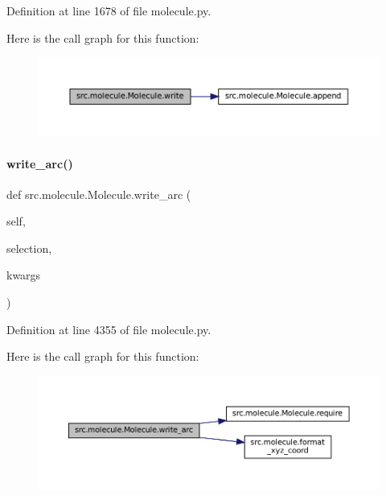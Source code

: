 Definition at line 1678 of file molecule.\+py.

Here is the call graph for this function\+:
\nopagebreak
\begin{figure}[H]
\begin{center}
\leavevmode
\includegraphics[width=350pt]{classsrc_1_1molecule_1_1Molecule_a557af72409188133ef446ee8dbed2338_cgraph}
\end{center}
\end{figure}
\mbox{\label{classsrc_1_1molecule_1_1Molecule_a5c04a001643a8165de635697f2d418f3}} 
\paragraph{\texorpdfstring{write\+\_\+arc()}{write\_arc()}}
{\footnotesize\ttfamily def src.\+molecule.\+Molecule.\+write\+\_\+arc (\begin{DoxyParamCaption}\item[{}]{self,  }\item[{}]{selection,  }\item[{}]{kwargs }\end{DoxyParamCaption})}



Definition at line 4355 of file molecule.\+py.

Here is the call graph for this function\+:
\nopagebreak
\begin{figure}[H]
\begin{center}
\leavevmode
\includegraphics[width=350pt]{classsrc_1_1molecule_1_1Molecule_a5c04a001643a8165de635697f2d418f3_cgraph}
\end{center}
\end{figure}
\mbox{\label{classsrc_1_1molecule_1_1Molecule_a722ba2597f067fc042169926c0b37274}} 
